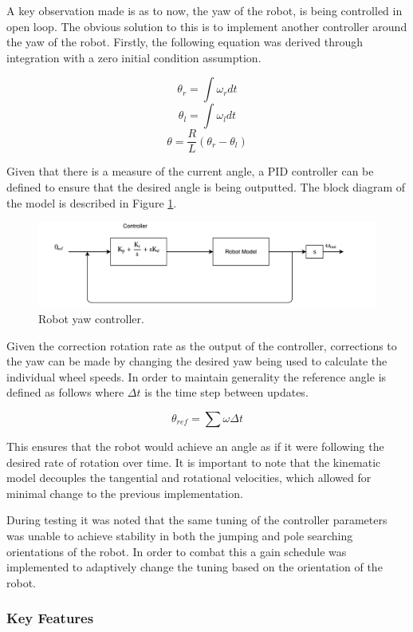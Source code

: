\documentclass[ece]{uw-wkrpt}
\begin{document}
A key observation made is as to now, the yaw of the robot, is being controlled in open loop. The obvious solution to this is to implement another controller around the yaw of the robot. Firstly, the following equation was derived through integration with a zero initial condition assumption.

\[\theta_r = \int\omega_rdt\]
\[\theta_l = \int\omega_ldt\]
\[\theta=\frac{R}{L}(\theta_r-\theta_l)\]

Given that there is a measure of the current angle, a PID controller can be defined to ensure that the desired angle is being outputted. The block diagram of the model is described in Figure \ref{fig:yawController}.

\begin{figure}
    \centering
    \includegraphics[width=5.5in]{res/yawController}
    \caption[Robot yaw controller]
          {Robot yaw controller.}
    \label{fig:yawController}
\end{figure}

Given the correction rotation rate as the output of the controller, corrections to the yaw can be made by changing the desired yaw being used to calculate the individual wheel speeds. In order to maintain generality the reference angle is defined as follows where $\Delta t$ is the time step between updates. 

\[\theta_{ref} = \sum\omega \Delta t\]

This ensures that the robot would achieve an angle as if it were following the desired rate of rotation over time. It is important to note that the kinematic model decouples the tangential and rotational velocities, which allowed for minimal change to the previous implementation. 

During testing it was noted that the same tuning of the controller parameters was unable to achieve stability in both the jumping and pole searching orientations of the robot. In order to combat this a gain schedule was implemented to adaptively change the tuning based on the orientation of the robot. 

\subsubsection{Key Features}
\end{document}
